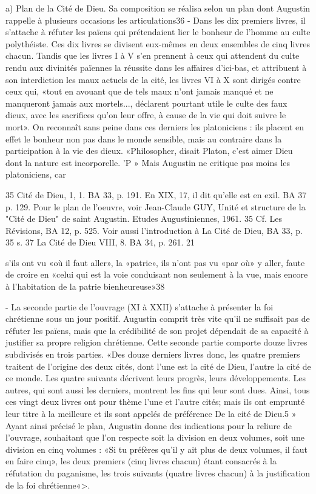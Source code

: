 a)	Plan de la Cité de Dieu. Sa composition se réalisa selon un plan dont Augustin rappelle à plusieurs occasions les articulations36 
- Dans les  dix  premiers  livres, il s'attache à réfuter les païens qui prétendaient lier le bonheur de l'homme au culte polythéiste. Ces dix livres se divisent eux-mêmes en deux ensembles de cinq livres chacun. Tandis que les livres I à V s'en prennent à ceux qui attendent du culte rendu aux divinités païennes la réussite dans les affaires d'ici-bas, et attribuent à son interdiction les maux actuels de la cité, les livres VI à X sont dirigés contre ceux qui, «tout en avouant que de tels maux n'ont jamais manqué et ne manqueront jamais aux mortels..., déclarent pourtant utile le culte des faux dieux, avec les sacrifices qu'on leur offre, à cause de la vie qui doit suivre le mort». On reconnaît sans peine dans ces derniers les platoniciens : ils placent en effet le bonheur non pas dans le monde sensible, mais au contraire dans la participation à la vie des dieux. «Philosopher, disait Platon, c'est aimer Dieu dont la nature est incorporelle. 'P » Mais Augustin ne critique pas moins les platoniciens, car

35 Cité de Dieu, 1, 1. BA 33, p. 191. En XIX, 17, il dit qu'elle est en exil. BA 37 p. 129. Pour le plan de l'oeuvre, voir Jean-Claude GUY, Unité et structure de la "Cité de Dieu" de saint Augustin. Etudes Augustiniennes, 1961.
35 Cf. Les Révisions, BA 12, p. 525. Voir aussi l'introduction à La Cité de Dieu, BA 33, p. 35 s.
37 La Cité de Dieu VIII, 8. BA 34, p. 261.
21
 
s'ils ont vu «où il faut aller», la «patrie»,	ils n'ont pas vu «par où» y aller, faute	  de croire en «celui qui est la voie conduisant non seulement à la vue, mais encore à l'habitation de la patrie bienheureuse»38  

- La seconde partie de l'ouvrage (XI à XXII) s'attache à présenter la foi chrétienne sous un jour positif. Augustin comprit très vite qu'il ne suffisait pas de réfuter les païens, mais que la crédibilité de son projet dépendait de sa capacité à justifier sa propre religion chrétienne. Cette seconde partie comporte douze livres subdivisés en trois parties. «Des douze derniers livres donc, les quatre premiers traitent de l'origine des deux cités, dont l'une est la cité de Dieu, l'autre la cité de ce monde. Les quatre suivants décrivent leurs progrès, leurs développements. Les autres, qui sont aussi les derniers, montrent les fins qui leur sont dues. Ainsi, tous ces vingt­ deux livres ont pour thème l'une et l'autre cités; mais ils ont emprunté leur titre à la meilleure et ils sont appelés de préférence De la cité de Dieu.5 » Ayant ainsi précisé le plan, Augustin donne des indications pour la reliure de l'ouvrage, souhaitant que l'on respecte soit la division en deux volumes, soit une division en cinq volumes : «Si tu
préfères qu'il y ait plus de deux volumes, il faut en faire cinq», les deux premiers	  (cinq livres chacun) étant consacrés à la réfutation du paganisme, les trois suivants
(quatre livres chacun) à la justification de la foi chrétienne«>.


